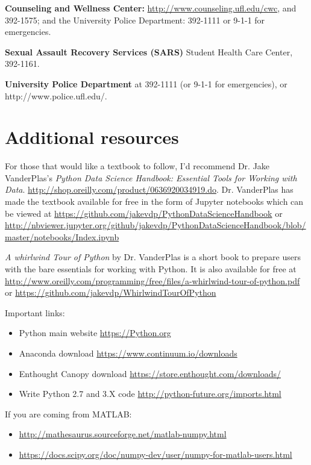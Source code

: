 \documentclass{article}
\begin{document}
\textbf{Counseling and Wellness Center:} \url{http://www.counseling.ufl.edu/cwc}, and  392-1575; and the University Police Department: 392-1111 or 9-1-1 for emergencies. 

\textbf{Sexual Assault Recovery Services (SARS)} 
Student Health Care Center, 392-1161. 

\textbf{University Police Department} at 392-1111 (or 9-1-1 for emergencies), or http://www.police.ufl.edu/. 

\section{Additional resources}
For those that would like a textbook to follow, I'd recommend Dr. Jake VanderPlas's \textit{Python Data Science Handbook: Essential Tools for Working with Data}. \url{http://shop.oreilly.com/product/0636920034919.do}. Dr. VanderPlas has made the textbook available for free in the form of Jupyter notebooks which can be viewed at \url{https://github.com/jakevdp/PythonDataScienceHandbook} or \url{http://nbviewer.jupyter.org/github/jakevdp/PythonDataScienceHandbook/blob/master/notebooks/Index.ipynb}

\textit{A whirlwind Tour of Python} by Dr. VanderPlas is a short book to prepare users with the bare essentials for working with Python. It is also available for free at \url{http://www.oreilly.com/programming/free/files/a-whirlwind-tour-of-python.pdf} or \url{https://github.com/jakevdp/WhirlwindTourOfPython}

Important links:
\begin{itemize}
\item Python main website \url{https://Python.org}
\item Anaconda download \url{https://www.continuum.io/downloads}
\item Enthought Canopy download \url{https://store.enthought.com/downloads/}
\item Write Python 2.7 and 3.X code \url{http://python-future.org/imports.html}
\end{itemize}

If you are coming from MATLAB:
\begin{itemize}
\item \url{http://mathesaurus.sourceforge.net/matlab-numpy.html}
\item \url{https://docs.scipy.org/doc/numpy-dev/user/numpy-for-matlab-users.html}
\end{itemize}


\end{document}
